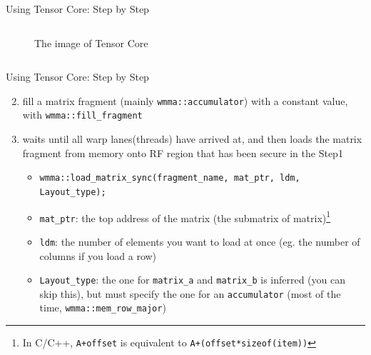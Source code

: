 \documentclass[dvipdfmx, 11pt, aspectratio=169]{beamer}   %
\begin{document}
\begin{frame}[fragile]{Using Tensor Core: Step by Step}
\begin{columns}
\begin{figure}
  \caption{The image of Tensor Core}
\end{figure}
\end{columns}
\end{frame}
\begin{frame}[fragile]{Using Tensor Core: Step by Step}
\begin{enumerate}\setcounter{enumi}{1}
  \item fill a matrix fragment (mainly \lstinline|wmma::accumulator|) with a constant value, with \lstinline|wmma::fill_fragment|
  \item waits until all warp lanes(threads) have arrived at, and then loads the matrix fragment from memory onto RF region that has been secure in the Step1
  \begin{itemize}
    \item \lstinline|wmma::load_matrix_sync(fragment_name, mat_ptr, ldm, Layout_type);|
    \item \lstinline|mat_ptr|: the top address of the matrix (the submatrix of matrix)\footnote{In C/C++, \lstinline|A+offset| is equivalent to \lstinline|A+(offset*sizeof(item))|}
    \item \lstinline|ldm|: the number of elements you want to load at once (eg. the number of columns if you load a row)
    \item \lstinline|Layout_type|: the one for \lstinline|matrix_a| and \lstinline|matrix_b| is inferred (you can skip this), but must specify the one for an \lstinline|accumulator| (most of the time, \lstinline|wmma::mem_row_major|)
  \end{itemize}
\end{enumerate}
\end{frame}
\end{document}
